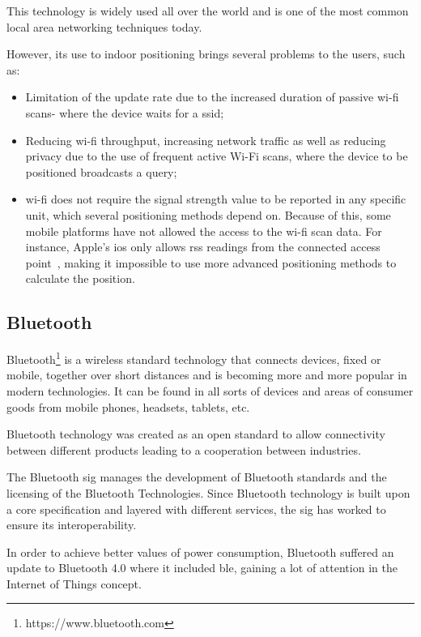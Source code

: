 This technology is widely used all over the world and is one of the most common local area networking techniques today.

However, its use to indoor positioning brings several problems to the users, such as:

\begin{itemize}
\item Limitation of the update rate due to the increased duration of passive \gls{wi-fi} scans- where the device waits for a \gls{ssid};

\item Reducing \gls{wi-fi} throughput, increasing network traffic as well as reducing privacy due to the use of frequent active Wi-Fi scans, where the device to be positioned broadcasts a query;

\item \gls{wi-fi} does not require the signal strength value to be reported in any specific unit, which several positioning methods depend on. Because of this, some mobile platforms have not allowed the access to the \gls{wi-fi} scan data. For instance, Apple’s \gls{ios} only allows \gls{rss} readings from the connected access point~\citep{fingerprintingble}, making it impossible to use more advanced positioning methods to calculate the position.
\end{itemize}

\subsection{Bluetooth}
\label{subsection:bluetooth}
Bluetooth\footnote{https://www.bluetooth.com} is a wireless standard technology that connects devices, fixed or mobile, together over short distances and is becoming more and more popular in modern technologies. It can be found in all sorts of devices and areas of consumer goods from mobile phones, headsets, tablets, etc. 

Bluetooth technology was created as an open standard to allow connectivity between different products leading to a cooperation between industries.

The Bluetooth \gls{sig} manages the development of Bluetooth standards and the licensing of the Bluetooth Technologies. Since Bluetooth technology is built upon a core specification and layered with different services, the \gls{sig} has worked to ensure its interoperability. 

In order to achieve better values of power consumption, Bluetooth suffered an update to Bluetooth 4.0 where it included \gls{ble}, gaining a lot of attention in the Internet of Things concept.

